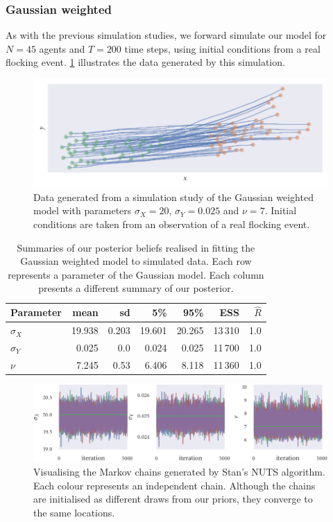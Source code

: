 \subsubsection{Gaussian weighted}

As with the previous simulation studies, we forward simulate our model for $N=45$ agents
and $T=200$ time steps, using initial conditions from a real flocking event.
\cref{fig:gauss_sim_study} illustrates the data generated by this simulation.

\begin{figure}[tbp]
  \includegraphics{gauss_sim.pdf}
  \caption{Data generated from a simulation study of the Gaussian weighted model with
  parameters $\sigma_X=20$, $\sigma_Y=0.025$ and $\nu=7$. Initial conditions are taken
  from an observation of a real flocking event.}
  \label{fig:gauss_sim_study}
\end{figure}
\begin{table}[tbp]
  \begin{tabular}{@{}lrrrrrr@{}}
    \toprule
    Parameter    & mean   & sd    & 5\%     & 95\%     & ESS & $\widehat{R}$ \\
    \midrule
    $\sigma_{X}$ & 19.938 & 0.203 & 19.601  & 20.265   & 13\,310            & 1.0       \\
    $\sigma_{Y}$ & 0.025  & 0.0   & 0.024   & 0.025    & 11\,700            & 1.0       \\
    $\nu$        & 7.245  & 0.53  & 6.406   & 8.118    & 11\,360            & 1.0       \\
    \bottomrule
  \end{tabular}
  \caption{Summaries of our posterior beliefs realised in fitting the Gaussian weighted
  model to simulated data. Each row represents a parameter of the Gaussian model. Each
  column presents a different summary of our posterior.}
  \label{tab:gauss_sim_study_summary}
\end{table}
\begin{figure}[tbp]
  \includegraphics{stan_gauss_trace.pdf}
  \caption{Visualising the Markov chains generated by Stan's NUTS algorithm. Each colour
  represents an independent chain. Although the chains are initialised as different draws
  from our priors, they converge to the same locations.}
  \label{fig:gauss_sim_study_chains}
\end{figure}
